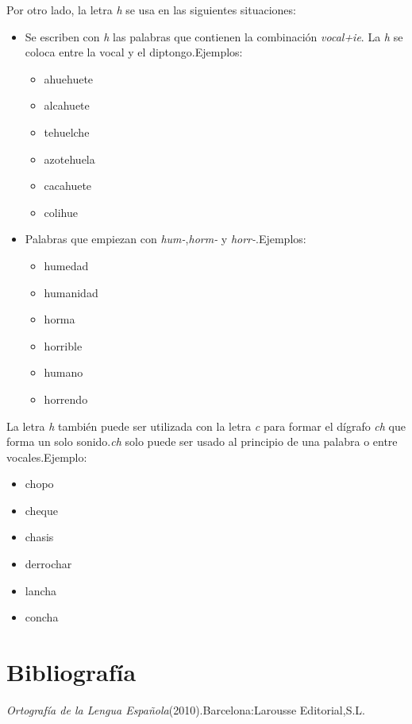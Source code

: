 \documentclass[a4paper,12pt]{article}
\begin{document}
Por otro lado, la letra \textit{h} se usa en las siguientes situaciones:
\begin{itemize}
    \item{Se escriben con \textit{h} las palabras que contienen la combinación
        \textit{vocal+ie}. La \textit{h} se coloca entre la vocal y el diptongo.Ejemplos:
        \begin{multicols}{3}
             \begin{itemize}
              \item ahuehuete
              \item alcahuete
              \item tehuelche
              \item azotehuela
              \item cacahuete
              \item colihue
        \end{itemize}
        \end{multicols}
        }
    \item{Palabras que empiezan con \textit{hum-},\textit{horm-} y \textit{horr-}.Ejemplos:
        \begin{multicols}{3}
             \begin{itemize}
              \item humedad
              \item humanidad
              \item horma
              \item horrible
              \item humano
              \item horrendo
        \end{itemize}
        \end{multicols}
        }
\end{itemize}
La letra \textit{h} también puede ser utilizada con la letra \textit{c} para formar el dígrafo
\textit{ch} que forma un solo sonido.\textit{ch} solo puede ser usado al principio de una
palabra o entre vocales.Ejemplo:
        \begin{multicols}{3}
             \begin{itemize}
              \item chopo
              \item cheque
              \item chasis
              \item derrochar
              \item lancha
              \item concha
        \end{itemize}
        \end{multicols}
\section*{Bibliografía}
\textit{Ortografía de la Lengua Española}(2010).Barcelona:Larousse Editorial,S.L. 
\end{document}
